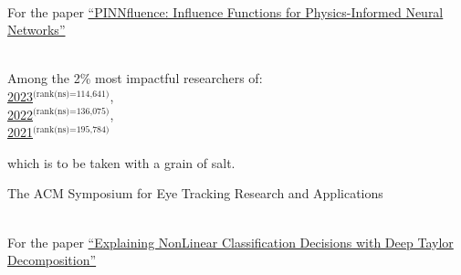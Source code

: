 
{
    \ifdefined\shortcv
        {}
    \else
        {
            \\
            \hspace*{\fill} For the paper
            \href{https://ml4physicalsciences.github.io/2024/files/NeurIPS_ML4PS_2024_254.pdf}{``PINNfluence: Influence Functions for Physics-Informed Neural Networks''}
        }
    \fi
}

{
    \ifdefined\shortcv
        {}
    \else
        {
            \\
            \hspace*{\fill}Among the 2\% most impactful researchers of:\\
            \hspace*{\fill}
            \href{https://elsevier.digitalcommonsdata.com/datasets/btchxktzyw/7}{2023}$^\text{(rank(ns)=114,641)}$,\\
            \hspace*{\fill}
            \href{https://elsevier.digitalcommonsdata.com/datasets/btchxktzyw/6}{2022}$^\text{(rank(ns)=136,075)}$,\\
            \hspace*{\fill}
            \href{https://elsevier.digitalcommonsdata.com/datasets/btchxktzyw/4}{2021}$^\text{(rank(ns)=195,784)}$\phantom{,}

            
            
            \hspace*{\fill}which is to be taken with a grain of salt. 
        }
    \fi
}



{
    \ifdefined\shortcv
        {}
    \else
        {
            The ACM Symposium for Eye Tracking Research and Applications
        }
    \fi
}



{
    \ifdefined\shortcv
        {}
    \else
        {
            \\
            \hspace*{\fill} For the paper
            \href{https://doi.org/10.1016/j.patcog.2016.11.008}{``Explaining NonLinear Classification Decisions with Deep Taylor Decomposition''}
        }
    \fi
}


